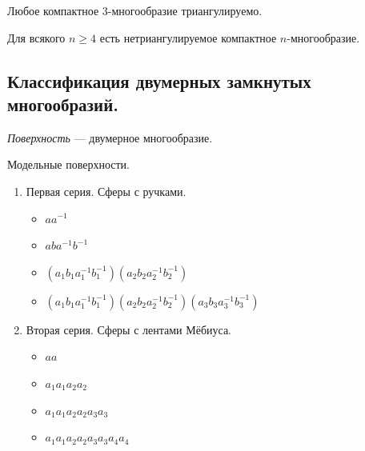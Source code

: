 \documentclass[12pt,a4paper]{article}
\begin{document}
    \begin{theorem}
        Любое компактное $3$-многообразие триангулируемо.
    \end{theorem}

    \begin{theorem}
        Для всякого $n \geqslant 4$ есть нетриангулируемое компактное $n$-многообразие.
    \end{theorem}

    \subsection{Классификация двумерных замкнутых многообразий.}

    \begin{definition}
        \emph{Поверхность} --- двумерное многообразие.
    \end{definition}

    \begin{definition}
        Модельные поверхности.
        \begin{enumerate}
            \item Первая серия. Сферы с ручками.
                \begin{itemize}
                    \item $a a^{-1}$
                    \item $a b a^{-1} b^{-1}$
                    \item $(a_1 b_1 a_1^{-1} b_1^{-1}) (a_2 b_2 a_2^{-1} b_2^{-1})$
                    \item $(a_1 b_1 a_1^{-1} b_1^{-1}) (a_2 b_2 a_2^{-1} b_2^{-1}) (a_3 b_3 a_3^{-1} b_3^{-1})$
                \end{itemize}
            \item Вторая серия. Сферы с лентами Мёбиуса.
                \begin{itemize}
                    \item $a a$
                    \item $a_1 a_1 a_2 a_2$
                    \item $a_1 a_1 a_2 a_2 a_3 a_3$
                    \item $a_1 a_1 a_2 a_2 a_3 a_3 a_4 a_4$
                \end{itemize}
        \end{enumerate}
    \end{definition}
\end{document}
